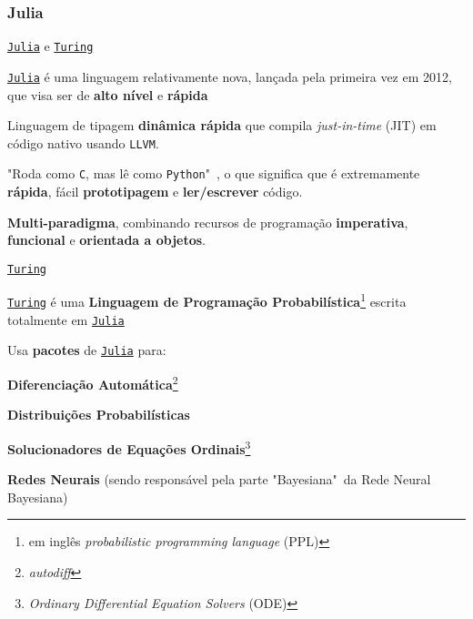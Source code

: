 \subsubsection{Julia}
\begin{frame}{\href{https://julialang.org/}{\texttt{Julia}} e \href{https://turing.ml}{\texttt{Turing}}}
    \begin{vfilleditems}
        \item \href{https://julialang.org/}{\texttt{Julia}} \parencite{bezanson2017julia} é uma linguagem relativamente nova, lançada pela primeira vez em 2012, que visa ser de \textbf{alto nível} e \textbf{rápida}
        \item Linguagem de tipagem \textbf{dinâmica rápida} que compila \textit{just-in-time} (JIT) em código nativo usando \texttt{LLVM}.
        \item "Roda como \texttt{C}, mas lê como \texttt{Python}"~\parencite{perkelJuliaComeSyntax2019}, o que significa que é extremamente \textbf{rápida}, fácil \textbf{prototipagem} e \textbf{ler/escrever} código.
        \item \textbf{Multi-paradigma}, combinando recursos de programação \textbf{imperativa}, \textbf{funcional} e \textbf{orientada a objetos}.
    \end{vfilleditems}
\end{frame}

\begin{frame}{\href{https://turing.ml}{\texttt{Turing}}}
    \begin{vfilleditems}
        \item \href{https://turing.ml}{\texttt{Turing}} é uma \textbf{Linguagem de Programação Probabilística}\footnote{em inglês \textit{probabilistic programming language} (PPL)} escrita totalmente em \href{https://julialang.org/}{\texttt{Julia}}
        \item Usa \textbf{pacotes} de \href{https://julialang.org/}{\texttt{Julia}} para:
        \begin{vfilleditems}
            \item \textbf{Diferenciação Automática}\footnote{\textit{autodiff}}
            \item \textbf{Distribuições Probabilísticas}
            \item \textbf{Solucionadores de Equações Ordinais}\footnote{\textit{Ordinary Differential Equation Solvers} (ODE)}
            \item \textbf{Redes Neurais} (sendo responsável pela parte "Bayesiana"~da Rede Neural Bayesiana)
        \end{vfilleditems}
    \end{vfilleditems}
\end{frame}

